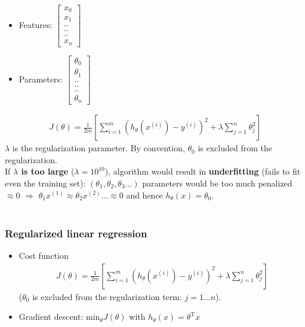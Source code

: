\documentclass[a4paper,12pt]{report}
\begin{document}
\begin{itemize}
\item Features: $\left[\begin{smallmatrix} x_0 \\ x_1 \\..\\..\\..\\x_n \end{smallmatrix} \right]$
\item Parameters: $\left[\begin{smallmatrix} \theta_0 \\ \theta_1 \\..\\..\\..\\\theta_n \end{smallmatrix} \right]$
\end{itemize}
\begin{align*}
J(\theta) = \frac{1}{2m} \left[ \sum_{i=1} ^m \left( h_{\theta}(x^{(i)}) - y^{(i)} \right)^2 + \lambda \sum_{j=1} ^{n} \theta_j ^2\right]
\end{align*}
$\lambda$ is the regularization parameter. By convention, $\theta_0$ is excluded from the regularization.\\
If \textbf{$\lambda$ is too large} ($\lambda = 10^{10}$), algorithm would result in \textbf{underfitting} (fails to fit even the training set): $(\theta_1,\theta_2,\theta_3...)$  parameters would be too much penalized $\approx 0$ $\Rightarrow$ $\theta_1x^{(1)} \approx \theta_2 x^{(2)}... \approx 0$ and hence $h_{\theta}(x) = \theta_0$.
\\ \\
\subsubsection{Regularized linear regression}
\begin{itemize}
\item Cost function
\begin{align*}
J(\theta) = \frac{1}{2m} \left[ \sum_{i=1} ^m \left( h_{\theta}(x^{(i)}) - y^{(i)} \right)^2 + \lambda \sum_{j=1} ^{n} \theta_j ^2\right]
\end{align*}
($\theta_0$ is excluded from the regularization term: $j=1...n$).
\item Gradient descent: $\mathrm{min}_{\theta} J(\theta)$ with $h_{\theta}(x) = \theta^{\mathrm{T}}x$ \\
\end{itemize}
\end{document}
